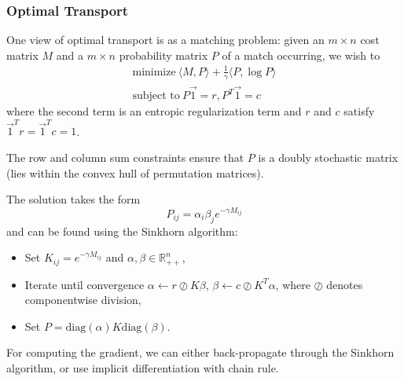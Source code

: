 \documentclass[11pt]{article}
\begin{document}
\subsubsection{Optimal Transport} 
One view of optimal transport is as a matching problem: given an $m \times n$ cost matrix $M$ and a $m \times n$ probability matrix $P$ of a match occurring, we wish to 
\begin{align*}
    \text{minimize}~\langle M, P \rangle + \frac{1}{\gamma} \langle P, \log P \rangle \\
    \text{subject to}~P\vec{1} = r, P^T\vec{1} = c
\end{align*}
where the second term is an entropic regularization term and $r$ and $c$ satisfy $\vec{1}^T r = \vec{1}^Tc = 1$. \par 
The row and column sum constraints ensure that $P$ is a doubly stochastic matrix (lies within the convex hull of permutation matrices). \par 
The solution takes the form 
\[ P_{ij} = \alpha_i \beta_j e^{-\gamma M_{ij}} \] 
and can be found using the Sinkhorn algorithm: 
\begin{itemize}
    \item Set $K_{ij} = e^{-\gamma M_{ij}}$ and $\alpha, \beta \in \mathbb{R}^n_{++}$,
    \item Iterate until convergence $\alpha \leftarrow r \oslash K\beta$, $\beta \leftarrow c \oslash K^T\alpha$, where $\oslash$ denotes componentwise division,
    \item Set $P = \mathrm{diag}(\alpha) K \mathrm{diag}(\beta)$.
\end{itemize}

For computing the gradient, we can either back-propagate through the Sinkhorn algorithm, or use implicit differentiation with chain rule.
\end{document}
